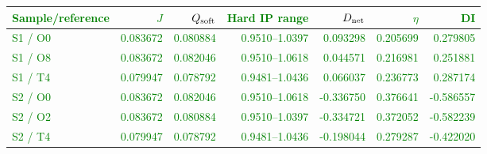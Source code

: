 \textcolor{green}{%
\begin{tabular}{lrrrrrr}
\hline
Sample/reference & $J$ & $Q_{\rm soft}$ & Hard IP range & $D_{\rm net}$ & $\eta$ & DI \\
\hline
S1 / O0 & 0.083672 & 0.080884 & 0.9510--1.0397 & 0.093298 & 0.205699 & 0.279805 \\
S1 / O8 & 0.083672 & 0.082046 & 0.9510--1.0618 & 0.044571 & 0.216981 & 0.251881 \\
S1 / T4 & 0.079947 & 0.078792 & 0.9481--1.0436 & 0.066037 & 0.236773 & 0.287174 \\
S2 / O0 & 0.083672 & 0.082046 & 0.9510--1.0618 & -0.336750 & 0.376641 & -0.586557 \\
S2 / O2 & 0.083672 & 0.080884 & 0.9510--1.0397 & -0.334721 & 0.372052 & -0.582239 \\
S2 / T4 & 0.079947 & 0.078792 & 0.9481--1.0436 & -0.198044 & 0.279287 & -0.422020 \\
\hline
\end{tabular}%
}
